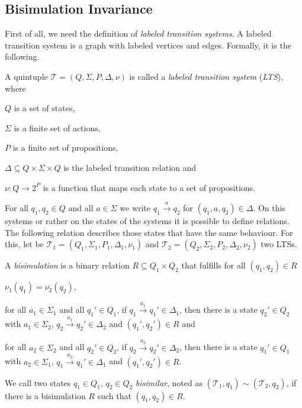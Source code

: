 
\subsection{Bisimulation Invariance}\label{subsec:bisimulationInvariance}

First of all, we need the definition of \textit{labeled transition systems}. A labeled transition system is a graph
with labeled vertices and edges. Formally, it is the following.

\begin{definition}
    \label{definition:lts}
    A quintuple $\mathcal{T} = (Q, \Sigma, P, \Delta, \nu)$ is called a \emph{labeled transition system} (\emph{LTS}),
    where
    \begin{compactitem}
        \item $Q$ is a set of states,
        \item $\Sigma$ is a finite set of actions,
        \item $P$ is a finite set of propositions,
        \item $\Delta \subseteq Q \times \Sigma \times Q$ is the labeled transition relation and
        \item $\nu: Q \rightarrow 2^P$ is a function that maps each state to a set of propositions.
    \end{compactitem}
\end{definition}

For all $q_1, q_2 \in Q$ and all $a \in \Sigma$ we write $q_1 \overset{a}{\rightarrow} q_2$ for $(q_1, a, q_2) \in
\Delta$. On this systems or rather on the states of the systems it is possible to define relations. The
following relation describes those states that have the same behaviour. For this, let be $\mathcal{T}_1 = (Q_1,
\Sigma_1, P_1, \Delta_1, \nu_1)$ and $\mathcal{T}_2 = (Q_2, \Sigma_2, P_2, \Delta_2, \nu_2)$ two LTSs.

\begin{definition}
    A \emph{bisimulation} is a binary relation $R \subseteq Q_1 \times Q_2$ that fulfills for all $(q_1, q_2) \in R$
    \begin{compactitem}
        \item $\nu_1 (q_1) = \nu_2 (q_2)$,
        \item for all $a_1 \in \Sigma_1$ and all $q_1' \in Q_1$, if $q_1 \overset{a_1}{\rightarrow} q_1' \in
        \Delta_1$, then there is a state $q_2' \in Q_2$ with $a_1 \in \Sigma_2$, $q_2
        \overset{a_1}{\rightarrow} q_2' \in \Delta_2$ and $(q_1', q_2') \in R$ and
        \item for all $a_2 \in \Sigma_2$ and all $q_2' \in Q_2$, if $q_2 \overset{a_2}{\rightarrow} q_2' \in
        \Delta_2$, then there is a state $q_1' \in Q_1$ with $a_2 \in \Sigma_1$, $q_1
        \overset{a_2}{\rightarrow} q_1' \in \Delta_1$ and $(q_1', q_2') \in R$.
    \end{compactitem}
    We call two states $q_1 \in Q_1$, $q_2 \in Q_2$ \emph{bisimilar}, noted as $(\mathcal{T}_1, q_1) \sim
    (\mathcal{T}_2, q_2)$, if there
    is a bisimulation $R$ such that $(q_1, q_2) \in R$.
\end{definition}

